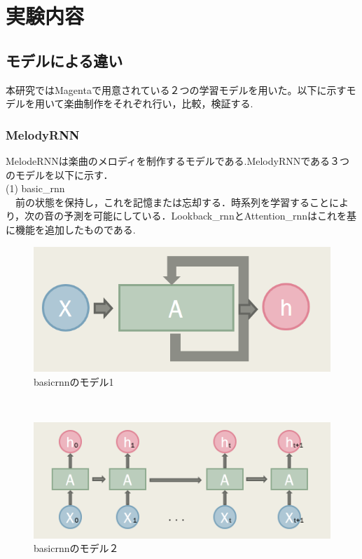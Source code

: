 \chapter{実験内容}
\section{モデルによる違い}
本研究ではMagentaで用意されている２つの学習モデルを用いた。以下に示すモデルを用いて楽曲制作をそれぞれ行い，比較，検証する.
\subsection{MelodyRNN}
MelodeRNNは楽曲のメロディを制作するモデルである.MelodyRNNである３つのモデルを以下に示す．\\
(1) basic\_rnn\\
　前の状態を保持し，これを記憶または忘却する．時系列を学習することにより，次の音の予測を可能にしている．Lookback\_rnnとAttention\_rnnはこれを基に機能を追加したものである.
\begin{figure}[!ht]
    \begin{screen}
    \begin{center}
        \includegraphics[scale=1, clip]{./img/basic3.png}
        \caption{basicrnnのモデル1}
        \label{fig:basicrnnのモデル1}
    \end{center}
    \end{screen}
\end{figure}\\
\newpage
\begin{figure}[!ht]
    \begin{screen}
    \begin{center}
        \includegraphics[scale=0.8, clip]{./img/basic4.png}
        \caption{basicrnnのモデル２}
        \label{fig:basicrnnのモデル２}
    \end{center}
    \end{screen}
\end{figure}\\
